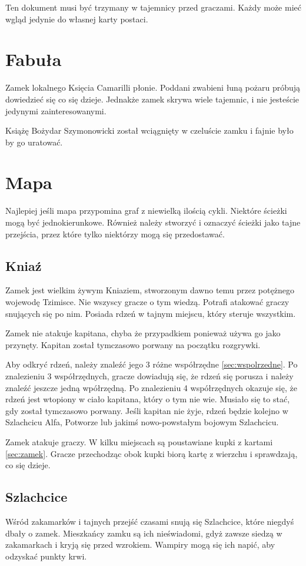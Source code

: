Ten dokument musi być trzymany w tajemnicy przed graczami.
Każdy może mieć wgląd jedynie do własnej karty postaci.

\section{Fabuła}
	Zamek lokalnego Księcia Camarilli płonie.
	Poddani zwabieni łuną pożaru próbują dowiedzieć się co się dzieje.
	Jednakże zamek skrywa wiele tajemnic, i nie jesteście jedynymi zainteresowanymi.
	
	Książę Bożydar Szymonowicki został wciągnięty w czeluście zamku i fajnie było by go uratować.
	
\section{Mapa}
	Najlepiej jeśli mapa przypomina graf z niewielką ilością cykli.
	Niektóre ścieżki mogą być jednokierunkowe.
	Również należy stworzyć i oznaczyć ścieżki jako tajne przejścia, przez które tylko niektórzy mogą się przedostawać.
	
	\subsection{Kniaź}
		Zamek jest wielkim żywym Kniaziem, stworzonym dawno temu przez potężnego wojewodę Tzimisce.
		Nie wszyscy gracze o tym wiedzą.
		Potrafi atakować graczy snujących się po nim.
		Posiada rdzeń w tajnym miejscu, który steruje wszystkim.
		
		Zamek nie atakuje kapitana, chyba że przypadkiem ponieważ używa go jako przynęty.
		Kapitan został tymczasowo porwany na początku rozgrywki.
		
		Aby odkryć rdzeń, należy znaleźć jego 3 różne współrzędne \ref{sec:wspolrzedne}.
		Po znalezieniu 3 współrzędnych, gracze dowiadują się, że rdzeń się porusza i należy znaleźć jeszcze jedną wpółrzędną.
		Po znalezieniu 4 współrzędnych okazuje się, że rdzeń jest wtopiony w ciało kapitana, który o tym nie wie.
		Musiało się to stać, gdy został tymczasowo porwany.
		Jeśli kapitan nie żyje, rdzeń będzie kolejno w Szlachcicu Alfa, Potworze lub jakimś nowo-powstałym bojowym Szlachcicu.
		
		Zamek atakuje graczy.
		W kilku miejscach są poustawiane kupki z kartami \ref{sec:zamek}.
		Gracze przechodząc obok kupki biorą kartę z wierzchu i sprawdzają, co się dzieje.

	\subsection{Szlachcice}
		Wśród zakamarków i tajnych przejść czasami snują się Szlachcice, które niegdyś dbały o zamek.
		Mieszkańcy zamku są ich nieświadomi, gdyż zawsze siedzą w zakamarkach i kryją się przed wzrokiem.
		Wampiry mogą się ich napić, aby odzyskać punkty krwi.
		
